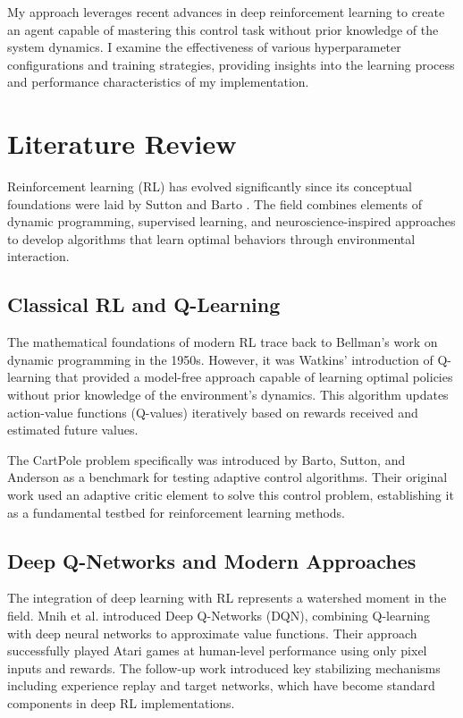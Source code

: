 \documentclass{article}
\begin{document}
My approach leverages recent advances in deep reinforcement learning to create an agent capable of mastering this control task without prior knowledge of the system dynamics. I examine the effectiveness of various hyperparameter configurations and training strategies, providing insights into the learning process and performance characteristics of my implementation.

\section{Literature Review}
Reinforcement learning (RL) has evolved significantly since its conceptual foundations were laid by Sutton and Barto \cite{sutton2018}. The field combines elements of dynamic programming, supervised learning, and neuroscience-inspired approaches to develop algorithms that learn optimal behaviors through environmental interaction.

\subsection{Classical RL and Q-Learning}
The mathematical foundations of modern RL trace back to Bellman's work on dynamic programming in the 1950s. However, it was Watkins' introduction of Q-learning \cite{watkins1989} that provided a model-free approach capable of learning optimal policies without prior knowledge of the environment's dynamics. This algorithm updates action-value functions (Q-values) iteratively based on rewards received and estimated future values.

The CartPole problem specifically was introduced by Barto, Sutton, and Anderson \cite{barto1983} as a benchmark for testing adaptive control algorithms. Their original work used an adaptive critic element to solve this control problem, establishing it as a fundamental testbed for reinforcement learning methods.

\subsection{Deep Q-Networks and Modern Approaches}
The integration of deep learning with RL represents a watershed moment in the field. Mnih et al. \cite{mnih2013} introduced Deep Q-Networks (DQN), combining Q-learning with deep neural networks to approximate value functions. Their approach successfully played Atari games at human-level performance using only pixel inputs and rewards. The follow-up work \cite{mnih2015} introduced key stabilizing mechanisms including experience replay and target networks, which have become standard components in deep RL implementations.
\end{document}
